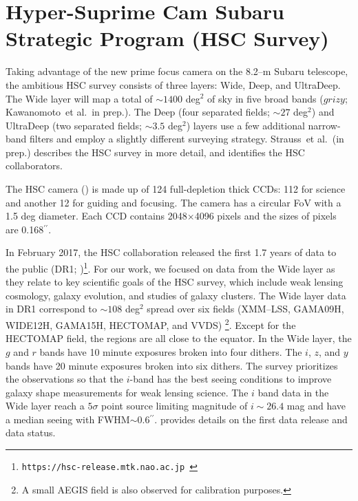 \documentclass[useamsfonts]{pasj01}
\def\asec{$^{\prime\prime}$}
\def\etal{{\ et al.~}}
\begin{document}
\section{Hyper-Suprime Cam Subaru Strategic Program (HSC Survey)}
    \label{sec:ssp}

    Taking advantage of the new prime focus camera on the 8.2--m Subaru telescope,
    the ambitious HSC survey consists of three layers: Wide, Deep, and UltraDeep.
    The Wide layer will map a total of ${\sim}1400$ deg$^2$ of sky in five broad bands
    ($grizy$; Kawanomoto\etal in prep.).
    The Deep (four separated fields; ${\sim}27$ deg$^2$) and UltraDeep (two separated
    fields; ${\sim}3.5$ deg$^2$) layers use a few additional narrow-band filters
    and employ a slightly different surveying strategy.
    Strauss\etal (in prep.) describes the HSC survey in more detail, and identifies the
    HSC collaborators.

    The HSC camera (\citealt{Miyazaki2012}) is made up of 124 full-depletion thick
    CCDs: 112 for science and another 12 for guiding and focusing.
    The camera has a circular FoV with a 1.5 deg diameter.
    Each CCD contains 2048$\times$4096 pixels and the sizes of pixels are 0.168\asec{}.

    In February 2017, the HSC collaboration released the first 1.7 years of data to
    the public (DR1;
    \citealt{HSCDR1})\footnote{\texttt{https://hsc-release.mtk.nao.ac.jp }}.
    For our work, we focused on data from the Wide layer as they relate to key
    scientific goals of the HSC survey, which include weak lensing cosmology, galaxy 
    evolution, and studies of galaxy clusters. 
    The Wide layer data in DR1 correspond to ${\sim}108$ deg$^2$ spread over 
    six fields (XMM--LSS, GAMA09H, WIDE12H, GAMA15H, HECTOMAP, and VVDS)
    \footnote{A small AEGIS field is also observed for calibration purposes.}.
    Except for the HECTOMAP field, the regions are all close to the equator.
    In the Wide layer, the $g$ and $r$ bands have 10 minute exposures broken into 
    four dithers.  
    The $i$, $z$, and $y$ bands have 20 minute exposures broken into six dithers. 
    The survey prioritizes the observations so that the $i$-band has the best seeing 
    conditions to improve galaxy shape measurements for weak lensing science. 
    The $i$ band data in the Wide layer reach a $5\sigma$ point source limiting 
    magnitude of $i{\sim} 26.4$ mag and have a median seeing with 
    FWHM${\sim}0.6$\asec{}. 
    \citealt{HSCDR1} provides details on the first data release and data status.
\end{document}
